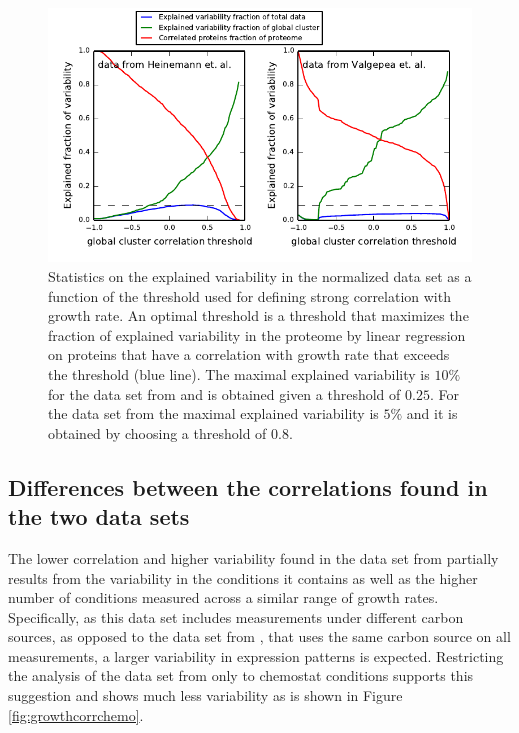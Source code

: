 \documentclass[a4paper]{article}
\begin{document}
\begin{figure}[H]
\begin{center}
\includegraphics[width=1\columnwidth]{ExpVar3.pdf}
\caption{\label{fig:threshold}
  Statistics on the explained variability in the normalized data set as a function of the threshold used for defining strong correlation with growth rate.
  An optimal threshold is a threshold that maximizes the fraction of explained variability in the proteome by linear regression on proteins that have a correlation with growth rate that exceeds the threshold (blue line).
  The maximal explained variability is $10\%$ for the data set from \cite{Heinemann2015} and is obtained given a threshold of $0.25$.
  For the data set from \cite{Valgepea2013} the maximal explained variability is $5\%$ and it is obtained by choosing a threshold of $0.8$.
}
\end{center}
\end{figure}

\subsection{Differences between the correlations found in the two data sets}
\label{heinemannchemo} 

The lower correlation and higher variability found in the data set from \cite{Heinemann2015} partially results from the variability in the conditions it contains as well as the higher number of conditions measured across a similar range of growth rates.
Specifically, as this data set includes measurements under different carbon sources, as opposed to the data set from \cite{Valgepea2013}, that uses the same carbon source on all measurements, a larger variability in expression patterns is expected.
Restricting the analysis of the data set from \cite{Heinemann2015} only to chemostat conditions supports this suggestion and shows much less variability as is shown in Figure \ref{fig:growthcorrchemo}.
\end{document}
